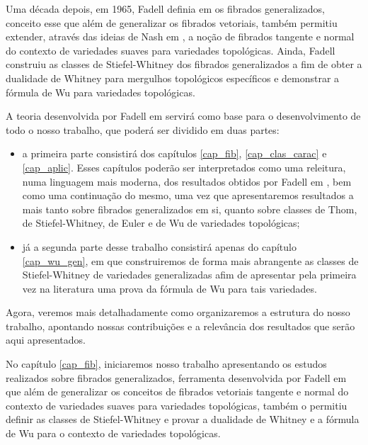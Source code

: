 \documentclass[12pt,oneside]{book} %
\begin{document}
\par Uma década depois, em 1965, Fadell definia em \cite{fadell_1} os fibrados generalizados, conceito esse que além de generalizar os fibrados vetoriais, também permitiu extender, através das ideias de Nash em \cite{nash}, a noção de fibrados tangente e  normal do contexto de variedades suaves para variedades topológicas. Ainda, Fadell construiu as classes de Stiefel-Whitney dos fibrados generalizados a fim de obter a dualidade de Whitney para mergulhos topológicos específicos e demonstrar a fórmula de Wu para variedades topológicas.

\par A teoria desenvolvida por Fadell em \cite{fadell_1} servirá como base para o desenvolvimento de todo o nosso trabalho, que poderá ser dividido em duas partes:

\begin{itemize}
	\item a primeira parte consistirá dos capítulos \ref{cap_fib}, \ref{cap_clas_carac} e \ref{cap_aplic}. Esses capítulos poderão ser interpretados como uma releitura, numa linguagem mais moderna, dos resultados obtidos por Fadell em \cite{fadell_1}, bem como uma continuação do mesmo, uma vez que apresentaremos resultados a mais tanto sobre fibrados generalizados em si, quanto sobre classes de Thom, de Stiefel-Whitney, de Euler e de Wu de variedades topológicas;
	\item já a segunda parte desse trabalho consistirá apenas do capítulo \ref{cap_wu_gen}, em que construiremos de forma mais abrangente as classes de Stiefel-Whitney de variedades generalizadas afim de apresentar pela primeira vez na literatura uma prova da fórmula de Wu para tais variedades.
\end{itemize}

\par Agora, veremos mais detalhadamente como organizaremos a estrutura do nosso trabalho, apontando nossas contribuições e a relevância dos resultados que serão aqui apresentados.

\par No capítulo \ref{cap_fib}, iniciaremos nosso trabalho apresentando os estudos realizados sobre fibrados generalizados, ferramenta desenvolvida por Fadell em \cite{fadell_1} que além de generalizar os conceitos de fibrados vetoriais tangente e normal do contexto de variedades suaves para variedades topológicas, também o permitiu definir as classes de Stiefel-Whitney e provar a dualidade de Whitney e a fórmula de Wu para o contexto de variedades topológicas.
\end{document}
